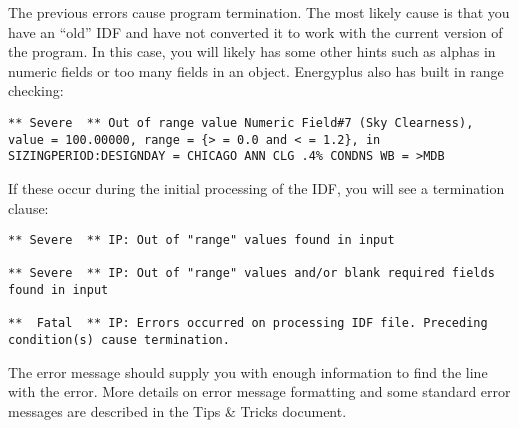 The previous errors cause program termination. The most likely cause is that you have an “old” IDF and have not converted it to work with the current version of the program. In this case, you will likely has some other hints such as alphas in numeric fields or too many fields in an object. Energyplus also has built in range checking:

\begin{lstlisting}
** Severe  ** Out of range value Numeric Field#7 (Sky Clearness), value = 100.00000, range = {> = 0.0 and < = 1.2}, in SIZINGPERIOD:DESIGNDAY = CHICAGO ANN CLG .4% CONDNS WB = >MDB
\end{lstlisting}

If these occur during the initial processing of the IDF, you will see a termination clause:

\begin{lstlisting}
** Severe  ** IP: Out of "range" values found in input

** Severe  ** IP: Out of "range" values and/or blank required fields found in input

**  Fatal  ** IP: Errors occurred on processing IDF file. Preceding condition(s) cause termination.
\end{lstlisting}

The error message should supply you with enough information to find the line with the error. More details on error message formatting and some standard error messages are described in the Tips \& Tricks document.
